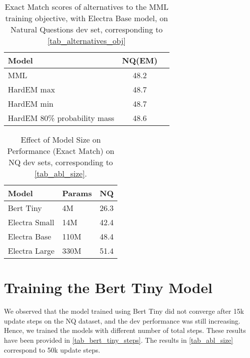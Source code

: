 \documentclass[11pt]{article}
\begin{document}
\begin{table}[h!]
\begin{center}
\begin{tabular}{lcc}
\toprule
\textbf{Model} & \textbf{NQ(EM)}\\ 
\toprule 
MML & 48.2 \\
HardEM max & 48.7 \\
HardEM min & 48.7 \\
HardEM 80\% probability mass & 48.6 \\
\bottomrule
\end{tabular}

\end{center}
\caption{Exact Match scores of alternatives to the MML training objective, with Electra Base model, on Natural Questions dev set, corresponding to \cref{tab_alternatives_obj}}
\label{tab_dev_alternatives_obj}
\end{table}


\begin{table}[h!]
\begin{center}
\begin{tabular}{llc}
\toprule
\textbf{Model} & \textbf{Params} & \textbf{NQ}\\ 
\toprule
Bert Tiny  & 4M & 26.3\\
Electra Small & 14M & 42.4 \\
Electra Base & 110M & 48.4 \\
Electra Large & 330M & 51.4 \\
\bottomrule
\end{tabular}

\end{center}
\caption{Effect of Model Size on Performance (Exact Match) on NQ dev sets, corresponding to \cref{tab_abl_size}.}
\label{tab_dev_abl_size}
\end{table}

\section{Training the Bert Tiny Model}
We observed that the model trained using Bert Tiny did not converge after 15k update steps on the NQ dataset, and the dev performance was still increasing. Hence, we trained the models with different number of total steps. These results have been provided in \cref{tab_bert_tiny_steps}. The results in \cref{tab_abl_size} correspond to 50k update steps.
\end{document}
